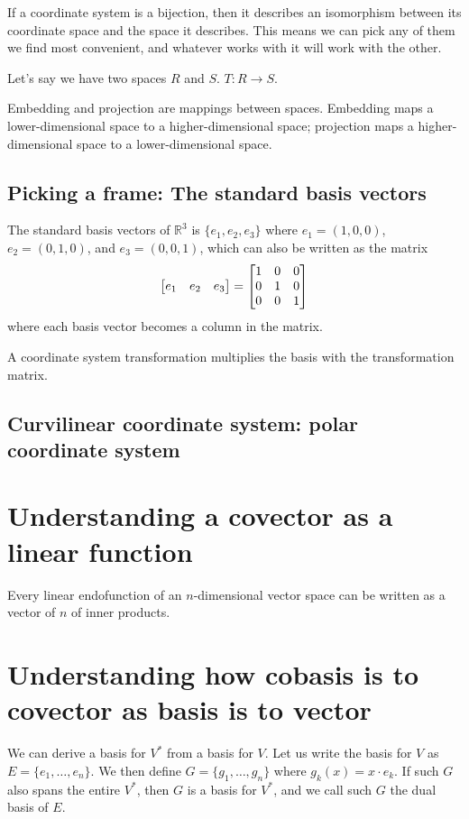 If a coordinate system is a bijection,
then it describes an isomorphism between
its coordinate space and the space it describes.
This means we can pick any of them we find most convenient,
and whatever works with it will work with the other.

Let's say we have two spaces $R$ and $S$.
$T : R \to S$.

Embedding and projection are mappings between spaces.
Embedding maps a lower-dimensional space to a higher-dimensional space;
projection maps a higher-dimensional space to a lower-dimensional space.

\subsection{Picking a frame: The standard basis vectors}

The standard basis vectors of $\mathbb{R}^3$
is $\{e_1,e_2,e_3\}$
where $e_1 = (1,0,0)$, $e_2 = (0,1,0)$, and $e_3 = (0,0,1)$,
which can also be written as the matrix
\[
    \begin{bmatrix} e_1 & e_2 & e_3 \end{bmatrix}
    = \begin{bmatrix} 1&0&0\\0&1&0\\0&0&1 \end{bmatrix}
\]
where each basis vector becomes a column in the matrix.

A coordinate system transformation multiplies the basis with the transformation matrix.

\subsection{Curvilinear coordinate system: polar coordinate system}

\section{Understanding a covector as a linear function}

Every linear endofunction of an $n$-dimensional vector space
can be written as a vector of $n$ of inner products.

\section{Understanding how cobasis is to covector as basis is to vector}

We can derive a basis for $V^*$ from a basis for $V$.
Let us write the basis for $V$ as \(E = \{ e_1, \ldots, e_n\}\).
We then define $G = \{ g_1, \ldots, g_n \}$ where \(g_k(x) = x \cdot e_k\).
If such $G$ also spans the entire $V^*$,
then $G$ is a basis for $V^*$,
and we call such $G$ the dual basis of $E$.

